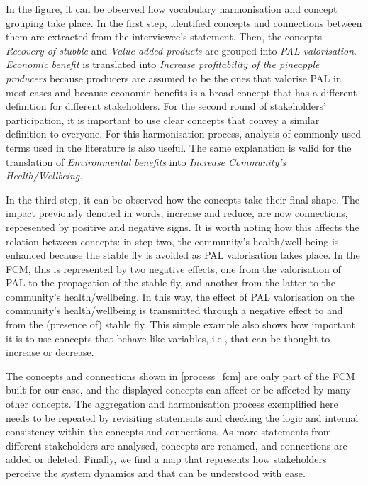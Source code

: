 In the figure, it can be observed how vocabulary harmonisation and concept grouping take place. In the first step, identified concepts and connections between them are extracted from the interviewee's statement. Then, the concepts \textit{Recovery of stubble} and \textit{Value-added products} are grouped into \textit{PAL valorisation}. \textit{Economic benefit} is translated into \textit{Increase profitability of the pineapple producers} because producers are assumed to be the ones that valorise PAL in most cases and because economic benefits is a broad concept that has a different definition for different stakeholders. For the second round of stakeholders' participation, it is important to use clear concepts that convey a similar definition to everyone. For this harmonisation process, analysis of commonly used terms used in the literature is also useful. The same explanation is valid for the translation of \textit{Environmental benefits} into \textit{Increase Community’s Health/Wellbeing}. 

In the third step, it can be observed how the concepts take their final shape. The impact previously denoted in words, increase and reduce, are now connections, represented by positive and negative signs. It is worth noting how this affects the relation between concepts: in step two, the community's health/well-being is enhanced because the stable fly is avoided as PAL valorisation takes place. In the FCM, this is represented by two negative effects, one from the valorisation of PAL to the propagation of the stable fly, and another from the latter to the community’s health/wellbeing. In this way, the effect of PAL valorisation on the community’s health/wellbeing is transmitted through a negative effect to and from the (presence of) stable fly. This simple example also shows how important it is to use concepts that behave like variables, i.e., that can be thought to increase or decrease. 

The concepts and connections shown in \cref{process_fcm} are only part of the FCM built for our case, and the displayed concepts can affect or be affected by many other concepts. The aggregation and harmonisation process exemplified here needs to be repeated by revisiting statements and checking the logic and internal consistency within the concepts and connections. As more statements from different stakeholders are analysed, concepts are renamed, and connections are added or deleted. Finally, we find a map that represents how stakeholders perceive the system dynamics and that can be understood with ease. 

